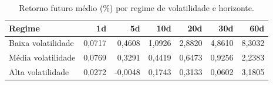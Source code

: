 \begin{table}[H]
\centering
\small
\caption{Retorno futuro médio (\%) por regime de volatilidade e horizonte.}
\label{tab:retnl-retornos}
\begin{tabular}{lrrrrrr}
\toprule
Regime & 1d & 5d & 10d & 20d & 30d & 60d \\
\midrule
Baixa volatilidade & 0,0717 & 0,4608 & 1,0926 & 2,8820 & 4,8610 & 8,3032 \\
Média volatilidade & 0,0769 & 0,3291 & 0,4419 & 0,6473 & 0,9256 & 2,2383 \\
Alta volatilidade & 0,0272 & -0,0048 & 0,1743 & 0,3133 & 0,0602 & 3,1805 \\
\bottomrule
\end{tabular}
\end{table}